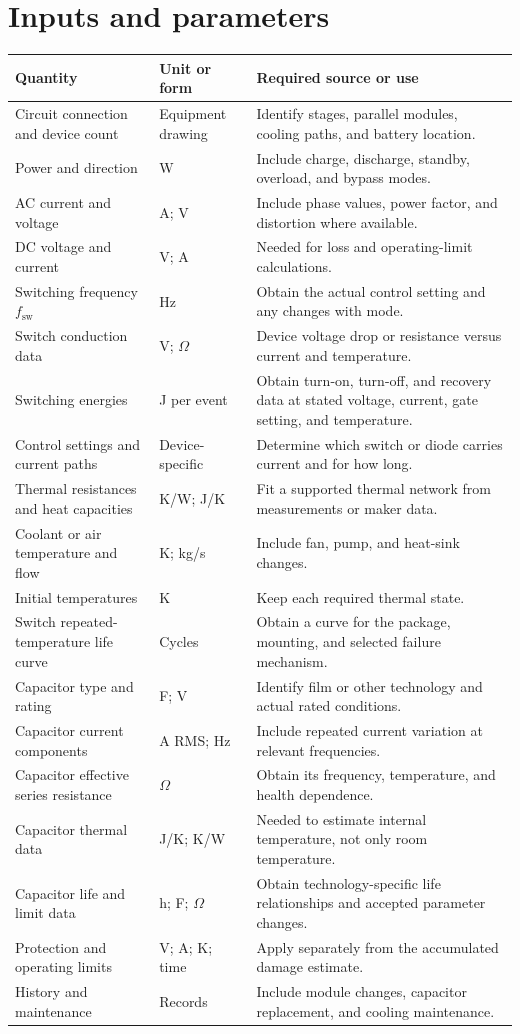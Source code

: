 \documentclass[11pt,a4paper]{report}
\begin{document}
\section{Inputs and parameters}
\begin{longtable}{L{0.22\textwidth}L{0.17\textwidth}L{0.49\textwidth}}
\toprule Quantity & Unit or form & Required source or use \\ \midrule\endhead
Circuit connection and device count & Equipment drawing & Identify stages, parallel modules, cooling paths, and battery location. \\
Power and direction & W & Include charge, discharge, standby, overload, and bypass modes. \\
AC current and voltage & A; V & Include phase values, power factor, and distortion where available. \\
DC voltage and current & V; A & Needed for loss and operating-limit calculations. \\
Switching frequency $f_{\mathrm{sw}}$ & Hz & Obtain the actual control setting and any changes with mode. \\
Switch conduction data & V; $\Omega$ & Device voltage drop or resistance versus current and temperature. \\
Switching energies & J per event & Obtain turn-on, turn-off, and recovery data at stated voltage, current, gate setting, and temperature. \\
Control settings and current paths & Device-specific & Determine which switch or diode carries current and for how long. \\
Thermal resistances and heat capacities & K/W; J/K & Fit a supported thermal network from measurements or maker data. \\
Coolant or air temperature and flow & K; kg/s & Include fan, pump, and heat-sink changes. \\
Initial temperatures & K & Keep each required thermal state. \\
Switch repeated-temperature life curve & Cycles & Obtain a curve for the package, mounting, and selected failure mechanism. \\
Capacitor type and rating & F; V & Identify film or other technology and actual rated conditions. \\
Capacitor current components & A RMS; Hz & Include repeated current variation at relevant frequencies. \\
Capacitor effective series resistance & $\Omega$ & Obtain its frequency, temperature, and health dependence. \\
Capacitor thermal data & J/K; K/W & Needed to estimate internal temperature, not only room temperature. \\
Capacitor life and limit data & h; F; $\Omega$ & Obtain technology-specific life relationships and accepted parameter changes. \\
Protection and operating limits & V; A; K; time & Apply separately from the accumulated damage estimate. \\
History and maintenance & Records & Include module changes, capacitor replacement, and cooling maintenance. \\
\bottomrule
\end{longtable}
\end{document}

